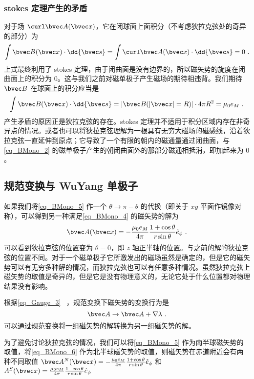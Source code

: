 \subsubsection{stokes 定理产生的矛盾}
对于场 $\curl \bvec A(\bvec x)$，它在闭球面上面积分（不考虑狄拉克弦处的奇异的部分）为
\begin{equation}\label{eq_BMono_3}
\int \bvec B(\bvec x)\cdot \dd{\bvec s} =\int \curl \bvec A(\bvec x) \cdot \dd{\bvec s}=0~. 
\end{equation}
上式最终利用了 stokes 定理，由于闭曲面是没有边界的，所以磁矢势的旋度在闭曲面上的积分为 $0$。这与我们之前对磁单极子产生磁场的期待相违背。我们期待 $\bvec B$ 在球面上的积分应当是
\begin{equation}\label{eq_BMono_2}
\int \bvec B(\bvec x)\cdot \dd{\bvec s}=|\bvec B(|\bvec x|=R)|\cdot 4\pi R^2=\mu_0 e_M~.
\end{equation}
产生矛盾的原因正是狄拉克弦的存在。stokes 定理并不适用于积分区域内存在非奇异点的情况。或者也可以将狄拉克弦理解为一根具有无穷大磁场的磁感线，沿着狄拉克弦一直延伸到原点；它导致了一个有限的朝内的磁通量通过闭曲面，与\autoref{eq_BMono_2} 的磁单极子产生的朝闭曲面外的那部分磁通相抵消，即加起来为 $0$。
\subsection{规范变换与 WuYang 单极子}

如果我们将\autoref{eq_BMono_5} 作一个 $\theta\rightarrow \pi-\theta$ 的代换（即关于 $xy$ 平面作镜像对称），可以得到另一种满足\autoref{eq_BMono_4} 的磁矢势的解为
\begin{equation}\label{eq_BMono_6}
\bvec A(\bvec x)=-\frac{\mu_0 e_M}{4\pi}\frac{1+\cos\theta}{r\sin\theta}
\hat e_\phi~.
\end{equation}
可以看到狄拉克弦的位置变为 $\theta=0$，即 $z$ 轴正半轴的位置。与之前的解的狄拉克弦的位置不同。对于一个磁单极子它所激发出的磁场虽然是确定的，但是它的磁矢势可以有无穷多种解的情况，而狄拉克弦也可以有任意多种情况。虽然狄拉克弦上磁矢势的取值是奇异的，但是它是没有物理意义的，无论它处于什么位置都对物理结果没有影响。

根据\autoref{eq_Gauge_3}~ ，规范变换下磁矢势的变换行为是
\begin{equation}
\bvec A\rightarrow \bvec A+\nabla \lambda~.
\end{equation}
可以通过规范变换将一组磁矢势的解转换为另一组磁矢势的解。

为了避免讨论狄拉克弦的情况，我们可以将\autoref{eq_BMono_5} 作为南半球磁矢势的取值，将\autoref{eq_BMono_6} 作为北半球磁矢势的取值，则磁矢势在赤道附近会有两种不同取值 $\bvec A^N(\bvec x)=-\frac{\mu_0 e_M}{4\pi}\frac{1+\cos\theta}{r\sin\theta}
\hat e_\phi$ 和 $A^S(\bvec x)=\frac{\mu_0 e_M}{4\pi } \frac{1-\cos\theta}{r\sin\theta} \hat e_\phi$